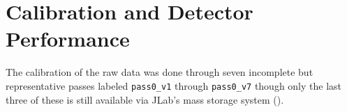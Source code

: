 \section{\label{sec:calib}Calibration and Detector Performance}

The calibration of the raw data was done through seven incomplete but representative passes labeled \verb+pass0_v1+ through \verb+pass0_v7+ though only the last three of these is still available via JLab's mass storage system ().








